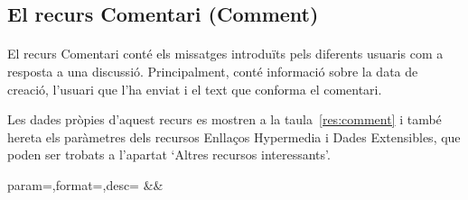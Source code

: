 \subsection{El recurs Comentari (Comment)}

    \paragraph{}
    El recurs Comentari conté els missatges introduïts pels diferents usuaris com a resposta a una discussió. Principalment, conté informació sobre la data de creació, l'usuari que l'ha enviat i el text que conforma el comentari.

    Les dades pròpies d'aquest recurs es mostren a la taula~\ref{res:comment} i també hereta els paràmetres dels recursos Enllaços Hypermedia i Dades Extensibles, que poden ser trobats a l'apartat `Altres recursos interessants'.

    \clearpage

    \begin{center}
             {param=\param,format=\format,desc=\desc}
             {\param&\format&\desc}
     \end{center}
